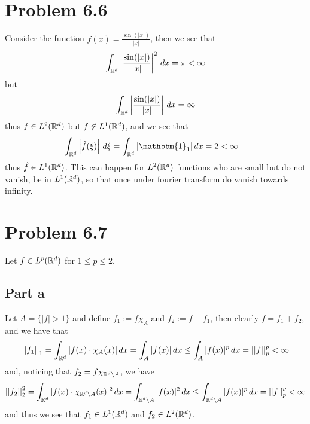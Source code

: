 \documentclass[12pt]{report}
\newcommand{\norm}[1]{\left|\left|#1\right|\right|}
\begin{document}
\maketitle

\section*{Problem 6.6}
Consider the function $f(x) = \frac{\sin(|x|)}{|x|}$, then we see that
\begin{equation*}
    \int_{\mathbb{R}^d} \left|\frac{\sin(|x|)}{|x|}\right|^2 \, dx  = \pi < \infty
\end{equation*}
but 
\begin{equation*}
    \int_{\mathbb{R}^d} \left|\frac{\sin(|x|)}{|x|}\right| \, dx = \infty
\end{equation*}
thus $f \in L^2(\mathbb{R}^d)$ but $f \not\in L^1(\mathbb{R}^d)$, and we see that
\begin{align*}
    \int_{\R^d} \left|\hat{f}(\xi)\right| \, d\xi &= \int_{\R^d} |\mathbbm{1}_1| \,dx = 2 < \infty
\end{align*}
thus $\hat{f} \in L^1(\mathbb{R}^d)$. This can happen for $L^2(\mathbb{R}^d)$ functions who are small but do not vanish, be in $L^1(\mathbb{R}^d)$, so that once under fourier transform do vanish towards infinity.

\section*{Problem 6.7}
Let $f \in L^p(\mathbb{R}^d)$ for $1 \leq p \leq 2$.
\subsection*{Part a}
Let $A = \{|f| > 1\}$ and define $f_1 := f\chi_A$  and $f_2:= f - f_1$, then clearly $f = f_1 + f_2$, and we have that 
\begin{equation*}
    \norm{f_1}_1 = \int_{\R^d} |f(x) \cdot \chi_A(x)| \, dx = \int_A |f(x)| \, dx \leq \int_A |f(x)|^p \, dx = \norm{f}_p^p < \infty
\end{equation*}
and, noticing that $f_2 = f\chi_{\mathbb{R}^d \setminus A}$, we have 
\begin{equation*}
    \norm{f_2}_2^2 = \int_{\R^d} |f(x) \cdot \chi_{\R^d \setminus A}(x)|^2 \, dx = \int_{\R^d \setminus A} |f(x)|^2 \, dx \leq \int_{\R^d \setminus A} |f(x)|^p \, dx = \norm{f}_p^p < \infty
\end{equation*}
and thus we see that $f_1 \in L^1(\mathbb{R}^d)$ and $f_2 \in L^2(\mathbb{R}^d)$.
\end{document}

